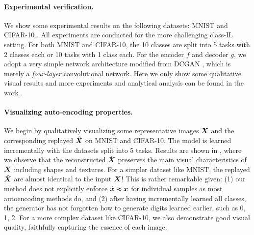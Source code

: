 \documentclass[\toplevelprefix/book-main.tex]{subfiles}
\begin{document}
\paragraph{Experimental verification.}
We show some experimental results on the following datasets: MNIST \cite{lecun1998gradient} and CIFAR-10 \cite{krizhevsky2014cifar}. All experiments are conducted for the more challenging class-IL setting. For both MNIST and CIFAR-10, the 10 classes are split into 5 tasks with 2 classes each or 10 tasks with 1 class each. For the encoder $f$ and decoder $g$, we adopt a very simple network architecture modified from DCGAN \cite{radford2016unsupervised}, which is merely a {\em four-layer} convolutional network. Here we only show some qualitative visual results and more experiments and analytical analysis can be found in the work \cite{tong2023incremental}.

\paragraph{Visualizing auto-encoding properties.}
We begin by qualitatively visualizing some representative images $\bm{X}$ and the corresponding replayed $\hat{\bm{X}}$ on MNIST and CIFAR-10. The model is learned incrementally with the datasets split into 5 tasks. Results are shown in , where we observe that the reconstructed $\hat{\bm{X}}$ preserves the main visual characteristics of $\bm{X}$ including shapes and textures. For a simpler dataset like MNIST, the replayed $\hat{\bm{X}}$ are almost identical to the input $\bm{X}$! This is rather remarkable given: (1) our method does not explicitly enforce $\hat{\bm{x}} \approx \bm{x}$ for individual samples as most autoencoding methods do, and (2) after having incrementally learned all classes, the generator has not forgotten how to generate digits learned earlier, such as 0, 1, 2.  For a more complex dataset like CIFAR-10, we also demonstrate good visual quality, faithfully capturing the essence of each image.
\end{document}
